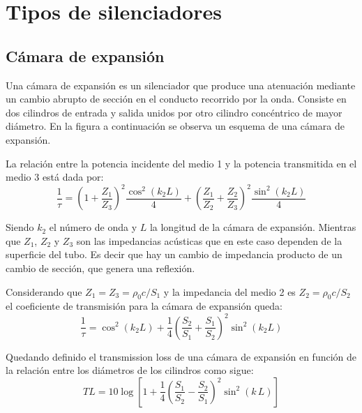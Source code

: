 \documentclass[a5paper,12pt,twoside]{book}
\begin{document}
\section{Tipos de silenciadores}


\subsection{Cámara de expansión}

Una cámara de expansión es un silenciador que produce una atenuación mediante un cambio abrupto de sección en el conducto recorrido por la onda.
Consiste en dos cilindros de entrada y salida unidos por otro cilindro concéntrico de mayor diámetro.
En la figura a continuación se observa un esquema de una cámara de expansión.

\begin{center}
    \def\svgwidth{\linewidth}
    
\end{center}

La relación entre la potencia incidente del medio 1 y la potencia transmitida en el medio 3 está dada por:
\begin{equation*}
    \dfrac{1}{\tau} = \left( 1+\frac{Z_1}{Z_3} \right)^2 \frac{\cos^2 (k_2 L)}{4} + \left( \frac{Z_1}{Z_2}+\frac{Z_2}{Z_3} \right)^2 \frac{\sin^2 (k_2 L)}{4}
\end{equation*}

Siendo $k_2$ el número de onda y $L$ la longitud de la cámara de expansión.
Mientras que $Z_1$, $Z_2$ y $Z_3$ son las impedancias acústicas que en este caso dependen de la superficie del tubo.
Es decir que hay un cambio de impedancia producto de un cambio de sección, que genera una reflexión.

Considerando que $Z_1=Z_3=\rho_0 c/S_1$ y la impedancia del medio 2 es $Z_2=\rho_0 c/S_2$ el coeficiente de transmisión para la cámara de expansión queda:
\begin{equation*}
    \dfrac{1}{\tau} = \cos^2 (k_2 L)+ \frac{1}{4} \left( \dfrac{S_2}{S_1} + \frac{S_1}{S_2} \right)^2 \sin^2(k_2 L)
\end{equation*}

Quedando definido el transmission loss de una cámara de expansión en función de la relación entre los diámetros de los cilindros como sigue:
\begin{equation*}
    TL = 10 \log \left[ 1 + \frac{1}{4} \left( \frac{S_1}{S_2} - \frac{S_2}{S_1} \right)^2 \sin^2 (k \, L) \right]
\end{equation*}
\end{document}
